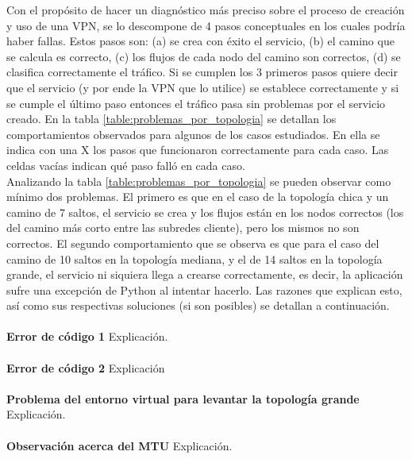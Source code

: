 Con el propósito de hacer un diagnóstico más preciso sobre el proceso de creación y uso de una VPN, se lo descompone de 4 pasos conceptuales en los cuales podría haber fallas. Estos pasos son: (a) se crea con éxito el servicio, (b) el camino que se calcula es correcto, (c) los flujos de cada nodo del camino son correctos, (d) se clasifica correctamente el tráfico. Si se cumplen los 3 primeros pasos quiere decir que el servicio (y por ende la VPN que lo utilice) se establece correctamente y si se cumple el último paso entonces el tráfico pasa sin problemas por el servicio creado. En la tabla \ref{table:problemas_por_topologia} se detallan los comportamientos observados para algunos de los casos estudiados. En ella se indica con una X los pasos que funcionaron correctamente para cada caso. Las celdas vacías indican qué paso falló en cada caso. \\

Analizando la tabla \ref{table:problemas_por_topologia} se pueden observar como mínimo dos problemas. El primero es que en el caso de la topología chica y un camino de 7 saltos, el servicio se crea y los flujos están en los nodos correctos (los del camino más corto entre las subredes cliente), pero los mismos no son correctos. El segundo comportamiento que se observa es que para el caso del camino de 10 saltos en la topología mediana, y el de 14 saltos en la topología grande, el servicio ni siquiera llega a crearse correctamente, es decir, la aplicación sufre una excepción de Python al intentar hacerlo. Las razones que explican esto, así como sus respectivas soluciones (si son posibles) se detallan a continuación.\\ \\
\textbf{Error de código 1}
Explicación. \\ \\
\textbf{Error de código 2}
Explicación \\ \\
\textbf{Problema del entorno virtual para levantar la topología grande}
Explicación. \\ \\
\textbf{Observación acerca del MTU}
Explicación. \\ \\

